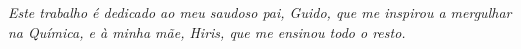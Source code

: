 \documentclass[
	12pt,				%
	openright,			%
	twoside,			%
	a4paper,			%
	english,			%
	brazil%
	]{abntex2}
\begin{document}
%
% 
%
\begin{folhadeaprovacao}
%
%
%    
%        
%
%
%      

	
  
\end{folhadeaprovacao}

\begin{dedicatoria}
   \vspace*{\fill}
   \centering
   \noindent
   \textit{
   	Este trabalho é dedicado ao meu saudoso pai, Guido, que me inspirou a mergulhar na Química, e à minha mãe, Hiris, que me ensinou todo o resto.   
} \vspace*{\fill}
\end{dedicatoria}
\end{document}
